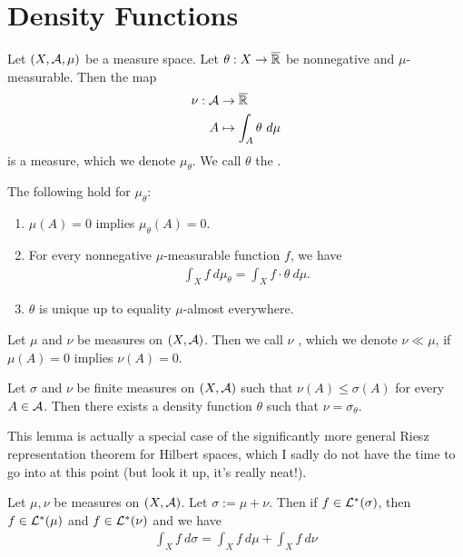 \section{Density Functions}
\begin{importanttheorem}{}{}
	Let $(X, \mathcal{A}, \mu)$ be a measure space. Let $\theta : X \to \overline{{\mathbb{R}}}$ be nonnegative and $\mu$-measurable. Then the map
	\begin{align*}
		\nu : \mathcal{A} &\to \overline{{\mathbb{R}}}\\
		A &\mapsto \int_A \theta ~d\mu
	\end{align*}
	is a measure, which we denote $\mu_\theta$. We call $\theta$ the .
\end{importanttheorem}
\begin{corollary}
	The following hold for $\mu_\theta$:
	\begin{enumerate}
		\item $\mu(A) = 0$ implies $\mu_\theta(A) = 0$.
		\item For every nonnegative $\mu$-measurable function $f$, we have
		\begin{align*}
			\int_X f ~d\mu_\theta = \int_X f \cdot \theta ~d\mu.
		\end{align*}
		\item $\theta$ is unique up to equality $\mu$-almost everywhere.
	\end{enumerate}
\end{corollary}
\begin{importantdefinition}{}{}
	Let $\mu$ and $\nu$ be measures on $(X, \mathcal{A})$. Then we call $\nu$ , which we denote $\nu \ll \mu$, if $\mu(A) = 0$ implies $\nu(A) = 0$.
\end{importantdefinition}
\begin{lemma}
	Let $\sigma$ and $\nu$ be finite measures on $(X, \mathcal{A})$ such that $\nu(A) \leq \sigma(A)$ for every $A \in \mathcal{A}$. Then there exists a density function $\theta$ such that $\nu = \sigma_\theta$.
\end{lemma}
This lemma is actually a special case of the significantly more general Riesz representation theorem for Hilbert spaces, which I sadly do not have the time to go into at this point (but look it up, it's really neat!).
\begin{lemma}
	Let $\mu, \nu$ be measures on $(X, \mathcal{A})$. Let $\sigma := \mu + \nu$. Then if $f \in \mathcal{L}^*(\sigma)$, then $f \in \mathcal{L}^*(\mu)$ and $f \in \mathcal{L}^*(\nu)$ and we have
	\begin{align*}
		\int_X f ~d\sigma = \int_X f ~d\mu + \int_X f ~d\nu
	\end{align*}
\end{lemma}

